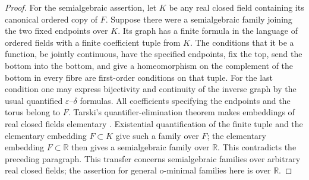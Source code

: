 \begin{proof}
For the semialgebraic assertion, let $K$ be any real closed
field containing its canonical ordered copy of $F$.  Suppose
there were a semialgebraic family joining the two fixed
endpoints over $K$.  Its graph has a finite formula in the
language of ordered fields with a finite coefficient tuple
from $K$.  The conditions that it be a function, be jointly
continuous, have the specified endpoints, fix the top, send
the bottom into the bottom, and give a homeomorphism on the
complement of the bottom in every fibre are first-order
conditions on that tuple.  For the last condition one may
express bijectivity and continuity of the inverse graph by
the usual quantified $\varepsilon$--$\delta$ formulas.
All coefficients specifying the endpoints and the torus
belong to $F$.  Tarski's quantifier-elimination theorem makes
embeddings of real closed fields elementary
\cite[Theorem~3.2 and Corollary~3.3, pp.~2--3]{SwanTarski}.
Existential quantification of the finite tuple
and the elementary embedding $F\subset K$ give such a family
over $F$; the elementary embedding $F\subset\mathbb R$ then
gives a semialgebraic family over $\mathbb R$.  This contradicts
the preceding paragraph.  This transfer concerns semialgebraic
families over arbitrary real closed fields; the assertion for
general o-minimal families here is over $\mathbb R$.
\end{proof}

